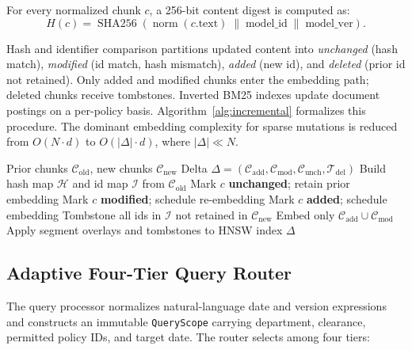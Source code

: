 \documentclass[journal]{IEEEtran}
\begin{document}
For every normalized chunk $c$, a 256-bit content digest is computed as:
\begin{equation}
  H(c)=\operatorname{SHA256}(\operatorname{norm}(c.\text{text})\;\|\;\text{model\_id}\;\|\;\text{model\_ver}).
  \label{eq:hash}
\end{equation}

Hash and identifier comparison partitions updated content into \emph{unchanged} (hash match), \emph{modified} (id match, hash mismatch), \emph{added} (new id), and \emph{deleted} (prior id not retained). Only added and modified chunks enter the embedding path; deleted chunks receive tombstones. Inverted BM25 indexes update document postings on a per-policy basis. Algorithm~\ref{alg:incremental} formalizes this procedure. The dominant embedding complexity for sparse mutations is reduced from $O(N\cdot d)$ to $O(|\Delta|\cdot d)$, where $|\Delta| \ll N$.

\begin{algorithm}[!t]
\caption{Incremental Policy Knowledge Compilation}
\label{alg:incremental}
\begin{algorithmic}[1]
\scriptsize
\REQUIRE Prior chunks $\mathcal{C}_{\text{old}}$, new chunks $\mathcal{C}_{\text{new}}$
\ENSURE Delta $\Delta=(\mathcal{C}_{\text{add}},\mathcal{C}_{\text{mod}},
        \mathcal{C}_{\text{unch}},\mathcal{T}_{\text{del}})$
\STATE Build hash map $\mathcal{H}$ and id map $\mathcal{I}$ from $\mathcal{C}_{\text{old}}$
    \STATE Mark $c$ \textbf{unchanged}; retain prior embedding
    \STATE Mark $c$ \textbf{modified}; schedule re-embedding
  \ELSE
    \STATE Mark $c$ \textbf{added}; schedule embedding
  \ENDIF
\ENDFOR
\STATE Tombstone all ids in $\mathcal{I}$ not retained in $\mathcal{C}_{\text{new}}$
\STATE Embed only $\mathcal{C}_{\text{add}}\cup\mathcal{C}_{\text{mod}}$
\STATE Apply segment overlays and tombstones to HNSW index
\RETURN $\Delta$
\end{algorithmic}
\end{algorithm}

\subsection{Adaptive Four-Tier Query Router}
The query processor normalizes natural-language date and version expressions and constructs an immutable \texttt{QueryScope} carrying department, clearance, permitted policy IDs, and target date. The router selects among four tiers:
\end{document}
